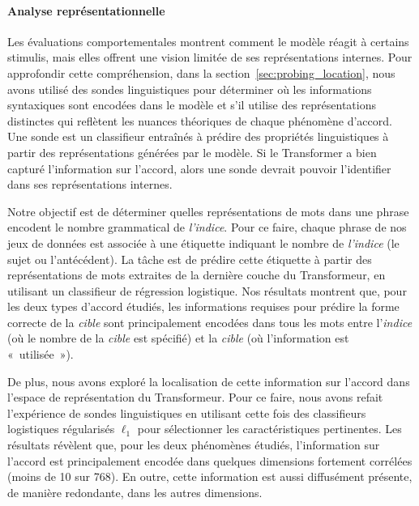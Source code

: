 \paragraph{Analyse représentationnelle} Les évaluations comportementales montrent comment le modèle réagit à certains stimulis, mais elles offrent une vision limitée de ses représentations internes. Pour approfondir cette compréhension, dans la section~\ref{sec:probing_location},  nous avons utilisé des sondes linguistiques pour déterminer où les informations syntaxiques sont encodées dans le modèle et s'il utilise des représentations distinctes qui reflètent les nuances théoriques de chaque phénomène d'accord. Une sonde est un classifieur entraînés à prédire des propriétés linguistiques à partir des représentations générées par le modèle. Si le Transformer a bien capturé l'information sur l’accord, alors une sonde devrait pouvoir l’identifier dans ses représentations internes.

Notre objectif est de déterminer quelles représentations de mots dans une phrase encodent le nombre grammatical de \emph{l'indice}. Pour ce faire, chaque phrase de nos jeux de données est associée à une étiquette indiquant le nombre de \emph{l'indice} (le sujet ou l'antécédent). La tâche est de prédire cette étiquette à partir des représentations de mots extraites de la dernière couche du Transformeur, en utilisant un classifieur de régression logistique. Nos résultats montrent que, pour les deux types d'accord étudiés, les informations requises pour prédire la forme correcte de la \emph{cible} sont principalement encodées dans tous les mots entre l'\emph{indice} (où le nombre de la \emph{cible} est spécifié) et la \emph{cible} (où l'information est «~utilisée~»).

De plus, nous avons exploré la localisation de cette information sur l'accord dans l'espace de représentation du Transformeur. Pour ce faire, nous avons refait l'expérience de sondes linguistiques en utilisant cette fois des classifieurs logistiques régularisés $\ell_1$ pour sélectionner les caractéristiques pertinentes.  Les résultats révèlent que, pour les deux phénomènes étudiés, l’information sur l’accord est principalement encodée dans quelques dimensions fortement corrélées (moins de 10 sur 768). En outre, cette information est aussi diffusément présente, de manière redondante, dans les autres dimensions.


\vspace{-0.5\baselineskip}
